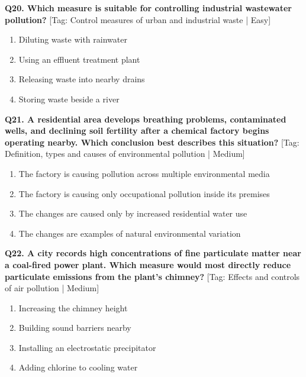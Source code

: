 \noindent\textbf{Q20. Which measure is suitable for controlling industrial wastewater pollution?} \hfill [Tag: Control measures of urban and industrial waste | Easy]
\begin{enumerate}[label=(\alph*),topsep=2pt,itemsep=1pt,partopsep=0pt,parsep=0pt]
    \item {Diluting waste with rainwater}
    \item {Using an effluent treatment plant}
    \item {Releasing waste into nearby drains}
    \item {Storing waste beside a river}
\end{enumerate}
\vspace{2mm}

\noindent\textbf{Q21. A residential area develops breathing problems, contaminated wells, and declining soil fertility after a chemical factory begins operating nearby. Which conclusion best describes this situation?} \hfill [Tag: Definition, types and causes of environmental pollution | Medium]
\begin{enumerate}[label=(\alph*),topsep=2pt,itemsep=1pt,partopsep=0pt,parsep=0pt]
    \item {The factory is causing pollution across multiple environmental media}
    \item {The factory is causing only occupational pollution inside its premises}
    \item {The changes are caused only by increased residential water use}
    \item {The changes are examples of natural environmental variation}
\end{enumerate}
\vspace{2mm}

\noindent\textbf{Q22. A city records high concentrations of fine particulate matter near a coal-fired power plant. Which measure would most directly reduce particulate emissions from the plant's chimney?} \hfill [Tag: Effects and controls of air pollution | Medium]
\begin{enumerate}[label=(\alph*),topsep=2pt,itemsep=1pt,partopsep=0pt,parsep=0pt]
    \item {Increasing the chimney height}
    \item {Building sound barriers nearby}
    \item {Installing an electrostatic precipitator}
    \item {Adding chlorine to cooling water}
\end{enumerate}
\vspace{2mm}

